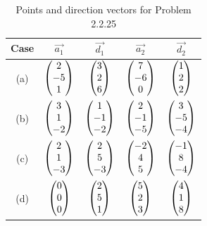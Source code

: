 \documentclass[12pt]{article}
\begin{document}
\begin{table}[H]
\centering
\begin{tabular}{|c|c|c|c|c|}
\hline
Case & $\vec{a_1}$ & $\vec{d_1}$ & $\vec{a_2}$ & $\vec{d_2}$ \\
\hline
(a) & $\begin{pmatrix}2 \\ -5 \\ 1\end{pmatrix}$ & $\begin{pmatrix}3 \\ 2 \\ 6\end{pmatrix}$ & $\begin{pmatrix}7 \\ -6 \\ 0\end{pmatrix}$ & $\begin{pmatrix}1 \\ 2 \\ 2\end{pmatrix}$ \\
\hline
(b) & $\begin{pmatrix}3 \\ 1 \\ -2\end{pmatrix}$ & $\begin{pmatrix}1 \\ -1 \\ -2\end{pmatrix}$ & $\begin{pmatrix}2 \\ -1 \\ -5\end{pmatrix}$ & $\begin{pmatrix}3 \\ -5 \\ -4\end{pmatrix}$ \\
\hline
(c) & $\begin{pmatrix}2 \\ 1 \\ -3\end{pmatrix}$ & $\begin{pmatrix}2 \\ 5 \\ -3\end{pmatrix}$ & $\begin{pmatrix}-2 \\ 4 \\ 5\end{pmatrix}$ & $\begin{pmatrix}-1 \\ 8 \\ -4\end{pmatrix}$ \\
\hline
(d) & $\begin{pmatrix}0 \\ 0 \\ 0\end{pmatrix}$ & $\begin{pmatrix}2 \\ 5 \\ 1\end{pmatrix}$ & $\begin{pmatrix}5 \\ 2 \\ 3\end{pmatrix}$ & $\begin{pmatrix}4 \\ 1 \\ 8\end{pmatrix}$ \\
\hline
\end{tabular}
\caption{Points and direction vectors for Problem 2.2.25}
\label{}
\end{table}
\end{document}
